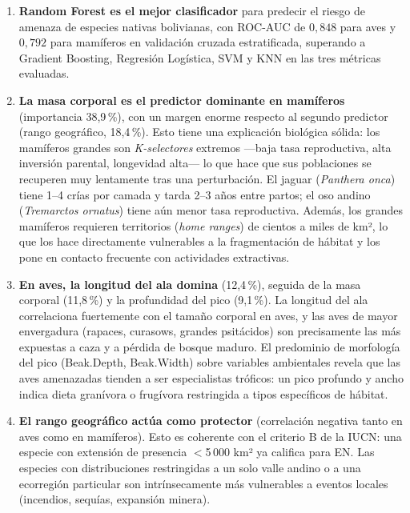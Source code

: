 \documentclass[12pt,a4paper]{article}
\begin{document}
\begin{enumerate}[label=\textbf{\arabic*.}]
  \item \textbf{Random Forest es el mejor clasificador} para predecir el riesgo de amenaza
        de especies nativas bolivianas, con ROC-AUC de $0{,}848$ para aves y $0{,}792$ para
        mamíferos en validación cruzada estratificada, superando a Gradient Boosting,
        Regresión Logística, SVM y KNN en las tres métricas evaluadas.

  \item \textbf{La masa corporal es el predictor dominante en mamíferos} (importancia 38,9\,\%),
        con un margen enorme respecto al segundo predictor (rango geográfico, 18,4\,\%).
        Esto tiene una explicación biológica sólida: los mamíferos grandes son
        \textit{K-selectores} extremos ---baja tasa reproductiva, alta inversión parental,
        longevidad alta--- lo que hace que sus poblaciones se recuperen muy lentamente
        tras una perturbación.  El jaguar (\textit{Panthera onca}) tiene 1--4 crías por
        camada y tarda 2--3 años entre partos; el oso andino (\textit{Tremarctos ornatus})
        tiene aún menor tasa reproductiva.  Además, los grandes mamíferos requieren
        territorios (\textit{home ranges}) de cientos a miles de km², lo que los hace
        directamente vulnerables a la fragmentación de hábitat y los pone en contacto
        frecuente con actividades extractivas.

  \item \textbf{En aves, la longitud del ala domina} (12,4\,\%), seguida de la masa
        corporal (11,8\,\%) y la profundidad del pico (9,1\,\%).
        La longitud del ala correlaciona fuertemente con el tamaño corporal en aves,
        y las aves de mayor envergadura (rapaces, curasows, grandes psitácidos) son
        precisamente las más expuestas a caza y a pérdida de bosque maduro.
        El predominio de morfología del pico (Beak.Depth, Beak.Width) sobre variables
        ambientales revela que las aves amenazadas tienden a ser especialistas
        tróficos: un pico profundo y ancho indica dieta granívora o frugívora
        restringida a tipos específicos de hábitat.

  \item \textbf{El rango geográfico actúa como protector} (correlación negativa tanto
        en aves como en mamíferos).  Esto es coherente con el criterio B de la IUCN:
        una especie con extensión de presencia $<$5\,000 km² ya califica para EN.
        Las especies con distribuciones restringidas a un solo valle andino o a una
        ecorregión particular son intrínsecamente más vulnerables a eventos locales
        (incendios, sequías, expansión minera).


\end{enumerate}
\end{document}
